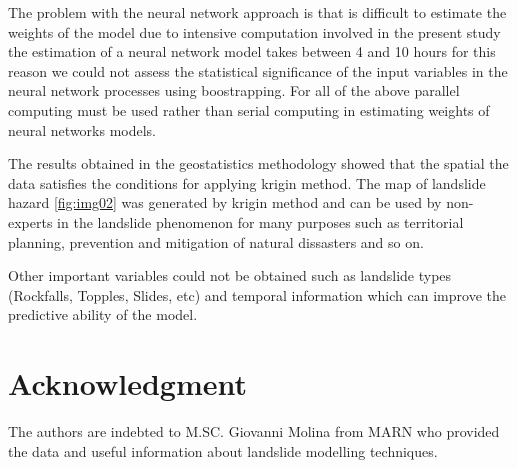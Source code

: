 \documentclass[11pt,twoside]{rmta2010esp}%
\begin{document}
The problem with the neural network approach is that is difficult to estimate the weights of the model due to intensive computation involved in the present study the estimation of a neural network model takes between 4 and 10 hours for this reason we could not assess the statistical significance of the input variables in the neural network processes using boostrapping. For all of the above parallel computing must be used rather than serial computing in estimating weights of neural networks models.



The results obtained in the geostatistics methodology showed that the spatial the data satisfies the conditions for applying krigin method. The map of landslide hazard \ref{fig:img02} was generated by krigin method and can be used by non-experts in the landslide phenomenon for many purposes such as territorial planning, prevention and mitigation of natural dissasters and so on. 

Other important variables could not be obtained such as landslide types (Rockfalls, Topples, Slides, etc) and temporal information which can improve the predictive ability of the model. 


\section{Acknowledgment}   
The authors are indebted to M.SC. Giovanni Molina from MARN who provided the data and useful information about landslide modelling techniques.
\end{document}
